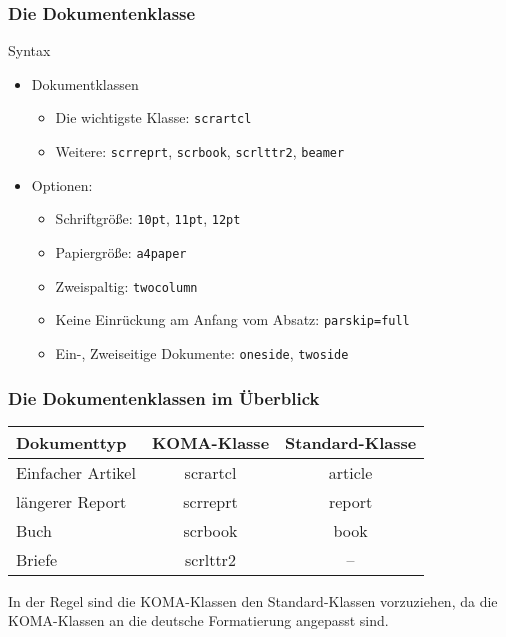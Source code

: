 \begin{frame}[fragile]
    \frametitle{Die Dokumentenklasse}
    \begin{block}{Syntax}
    \end{block}
    \pause
    \begin{itemize}
        \item Dokumentklassen
        \begin{itemize}
            \item Die wichtigste Klasse: \verb+scrartcl+\pause
            \item Weitere: \verb+scrreprt+, \verb+scrbook+, \verb+scrlttr2+, \verb+beamer+\pause
        \end{itemize}
        \item Optionen:
        \begin{itemize}
            \item Schriftgröße: \verb+10pt+, \verb+11pt+, \verb+12pt+\pause
            \item Papiergröße: \verb+a4paper+\pause
            \item Zweispaltig: \verb+twocolumn+\pause
            \item Keine Einrückung am Anfang vom Absatz: \verb+parskip=full+
            \item Ein-, Zweiseitige Dokumente: \verb+oneside+, \verb+twoside+
        \end{itemize}
    \end{itemize}
\end{frame}


\begin{frame}
    \frametitle{Die Dokumentenklassen im Überblick}

    \begin{tabular}{l|c|c}
        Dokumenttyp & KOMA-Klasse & Standard-Klasse\\
        \hline
        Einfacher Artikel & scrartcl & article\\
        längerer Report & scrreprt & report\\
        Buch & scrbook & book\\
        Briefe & scrlttr2 & --
    \end{tabular}
    
    \bigskip
    
    In der Regel sind die KOMA-Klassen den Standard-Klassen vorzuziehen, da die KOMA-Klassen an die deutsche Formatierung angepasst sind.
\end{frame}


